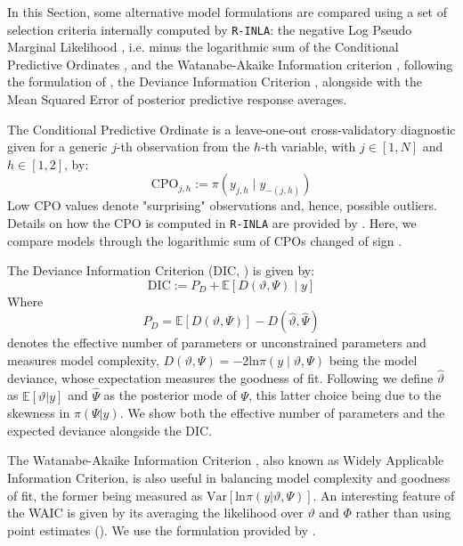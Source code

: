 \documentclass[openany]{book}
\begin{document}
In this Section, some alternative model formulations are compared using a set of selection criteria internally computed by \texttt{R-INLA}: the negative Log Pseudo Marginal Likelihood \citep[LPML,][]{Geisser, Gelfand}, i.e. minus the logarithmic sum of the Conditional Predictive Ordinates \citep{CPO, CPOINLA}, and the Watanabe-Akaike Information criterion \citep[WAIC,][]{WAIC}, following the formulation of \cite{GelmanWAIC}, the Deviance Information Criterion \citep[DIC,][]{DIC}, alongside with the Mean Squared Error of posterior predictive response averages.


The Conditional Predictive Ordinate is a leave-one-out cross-validatory diagnostic given for a generic $j$-th observation from the $h$-th variable, with $j \in [1, N]$ and $h \in [1,2]$, by: 
$$
\mathrm{CPO}_{j,h} := \pi(y_{j,h} \mid y_{-(j,h)})
$$  %
Low CPO values denote "surprising" observations and, hence, possible outliers. Details on how the CPO is computed in \texttt{R-INLA} are provided by \cite{CPOINLA}. Here, we compare models through the logarithmic sum of CPOs changed of sign \cite{Geisser}. %

The Deviance Information Criterion (DIC, \cite{DIC}) is given by:
$$
\mathrm{DIC} := P_D + \mathbb{E}[D(\vartheta, \Psi) \mid y]
$$
Where $$P_D = \mathbb{E}[D(\vartheta, \Psi)] - D(\hat{\vartheta}, \hat{\Psi})$$ denotes the effective number of parameters or unconstrained parameters and measures model complexity, $D(\vartheta, \Psi) = -2 \mathrm{ln} \pi(y \mid \vartheta, \Psi)$ being the model deviance, whose expectation measures the goodness of fit. Following \cite{INLA} we define $\hat{\vartheta}$ as $\mathbb{E}[\vartheta | y]$ and $\hat{\Psi}$  as the posterior mode of $\Psi$, this latter choice being due to the skewness in $\pi(\Psi | y)$. We show both the effective number of parameters and the expected deviance alongside the DIC.
 
The Watanabe-Akaike Information Criterion \cite{WAIC}, also known as Widely Applicable Information Criterion, is also useful in balancing model complexity and goodness of fit, the former being measured as $\mathrm{Var}[\mathrm{ln} \pi(y |\vartheta, \Psi)]$. An interesting feature of the WAIC is given by its averaging the likelihood over $\vartheta$ and $\Phi$ rather than using point estimates (\cite{GelmanWAIC}). We use the formulation provided by \cite{GelmanWAIC}. \\
 
\end{document}
